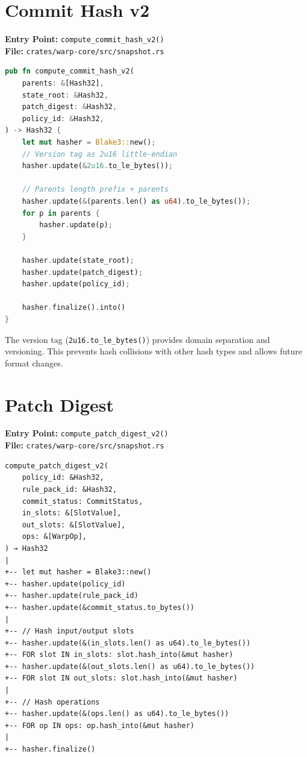 \section{Commit Hash v2}

\textbf{Entry Point:} \texttt{compute\_commit\_hash\_v2()} \\
\textbf{File:} \texttt{crates/warp-core/src/snapshot.rs}

\begin{lstlisting}[language=Rust]
pub fn compute_commit_hash_v2(
    parents: &[Hash32],
    state_root: &Hash32,
    patch_digest: &Hash32,
    policy_id: &Hash32,
) -> Hash32 {
    let mut hasher = Blake3::new();
    // Version tag as 2u16 little-endian
    hasher.update(&2u16.to_le_bytes());

    // Parents length prefix + parents
    hasher.update(&(parents.len() as u64).to_le_bytes());
    for p in parents {
        hasher.update(p);
    }

    hasher.update(state_root);
    hasher.update(patch_digest);
    hasher.update(policy_id);

    hasher.finalize().into()
}
\end{lstlisting}

\begin{watchout}
The version tag (\texttt{2u16.to\_le\_bytes()}) provides domain separation and versioning. This prevents hash collisions with other hash types and allows future format changes.
\end{watchout}

\section{Patch Digest}

\textbf{Entry Point:} \texttt{compute\_patch\_digest\_v2()} \\
\textbf{File:} \texttt{crates/warp-core/src/snapshot.rs}

\begin{verbatim}
compute_patch_digest_v2(
    policy_id: &Hash32,
    rule_pack_id: &Hash32,
    commit_status: CommitStatus,
    in_slots: &[SlotValue],
    out_slots: &[SlotValue],
    ops: &[WarpOp],
) → Hash32
|
+-- let mut hasher = Blake3::new()
+-- hasher.update(policy_id)
+-- hasher.update(rule_pack_id)
+-- hasher.update(&commit_status.to_bytes())
|
+-- // Hash input/output slots
+-- hasher.update(&(in_slots.len() as u64).to_le_bytes())
+-- FOR slot IN in_slots: slot.hash_into(&mut hasher)
+-- hasher.update(&(out_slots.len() as u64).to_le_bytes())
+-- FOR slot IN out_slots: slot.hash_into(&mut hasher)
|
+-- // Hash operations
+-- hasher.update(&(ops.len() as u64).to_le_bytes())
+-- FOR op IN ops: op.hash_into(&mut hasher)
|
+-- hasher.finalize()
\end{verbatim}


